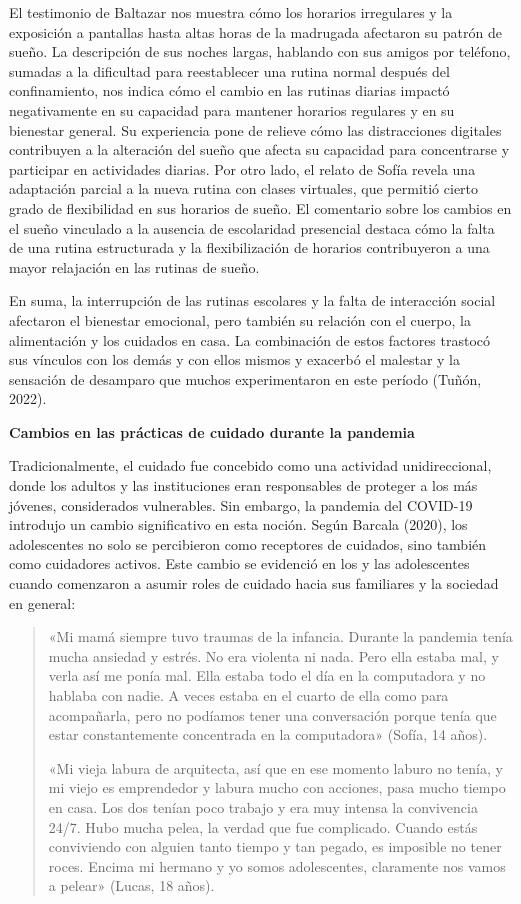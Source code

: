 El testimonio de Baltazar nos muestra cómo los horarios irregulares y la exposición a pantallas hasta altas horas de la madrugada afectaron su patrón de sueño. La descripción de sus noches largas, hablando con sus amigos por teléfono, sumadas a la dificultad para reestablecer una rutina normal después del confinamiento, nos indica cómo el cambio en las rutinas diarias impactó negativamente en su capacidad para mantener horarios regulares y en su bienestar general. Su experiencia pone de relieve cómo las distracciones digitales contribuyen a la alteración del sueño que afecta su capacidad para concentrarse y participar en actividades diarias. Por otro lado, el relato de Sofía revela una adaptación parcial a la nueva rutina con clases virtuales, que permitió cierto grado de flexibilidad en sus horarios de sueño. El comentario sobre los cambios en el sueño vinculado a la ausencia de escolaridad presencial destaca cómo la falta de una rutina estructurada y la flexibilización de horarios contribuyeron a una mayor relajación en las rutinas de sueño.

En suma, la interrupción de las rutinas escolares y la falta de interacción social afectaron el bienestar emocional, pero también su relación con el cuerpo, la alimentación y los cuidados en casa. La combinación de estos factores trastocó sus vínculos con los demás y con ellos mismos y exacerbó el malestar y la sensación de desamparo que muchos experimentaron en este período (Tuñón, 2022).

\textbf{Cambios en las prácticas de cuidado durante la pandemia}

Tradicionalmente, el cuidado fue concebido como una actividad unidireccional, donde los adultos y las instituciones eran responsables de proteger a los más jóvenes, considerados vulnerables. Sin embargo, la pandemia del COVID-19 introdujo un cambio significativo en esta noción. Según Barcala (2020), los adolescentes no solo se percibieron como receptores de cuidados, sino también como cuidadores activos. Este cambio se evidenció en los y las adolescentes cuando comenzaron a asumir roles de cuidado hacia sus familiares y la sociedad en general:

\begin{quote}
«Mi mamá siempre tuvo traumas de la infancia. Durante la pandemia tenía mucha ansiedad y estrés. No era violenta ni nada. Pero ella estaba mal, y verla así me ponía mal. Ella estaba todo el día en la computadora y no hablaba con nadie. A veces estaba en el cuarto de ella como para acompañarla, pero no podíamos tener una conversación porque tenía que estar constantemente concentrada en la computadora» (Sofía, 14 años).

«Mi vieja labura de arquitecta, así que en ese momento laburo no tenía, y mi viejo es emprendedor y labura mucho con acciones, pasa mucho tiempo en casa. Los dos tenían poco trabajo y era muy intensa la convivencia 24/7. Hubo mucha pelea, la verdad que fue complicado. Cuando estás conviviendo con alguien tanto tiempo y tan pegado, es imposible no tener roces. Encima mi hermano y yo somos adolescentes, claramente nos vamos a pelear» (Lucas, 18 años).
\end{quote}

